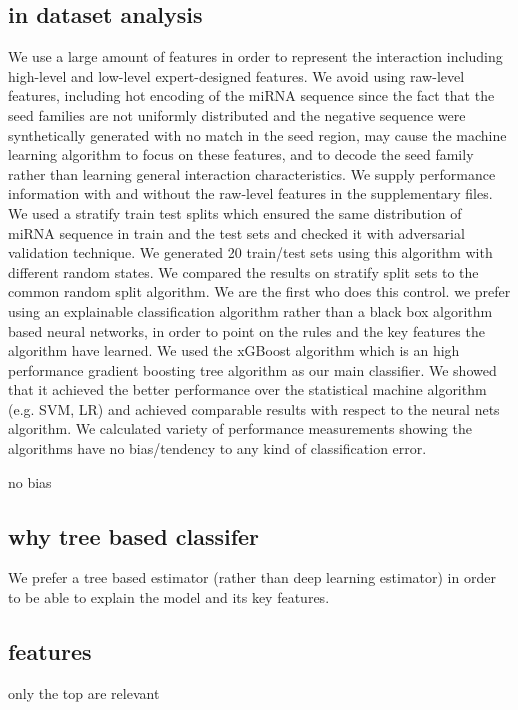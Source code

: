 \documentclass{bmcart}
\begin{document}
\subsection{in dataset analysis}
We use a large amount of features in order to represent the interaction including high-level and low-level expert-designed features. We avoid using raw-level features, including hot encoding of the miRNA sequence since the fact that the seed families are not uniformly distributed and the negative sequence were synthetically generated with no match in the seed region, may cause the machine learning algorithm to focus on these features, and to decode the seed family rather than learning general interaction characteristics. We supply performance information with and without the raw-level features in the supplementary files. 
We used a stratify train test splits which ensured the same distribution of miRNA sequence in train and the test sets and checked it with adversarial validation technique. We generated 20 train/test sets using this algorithm with different random states. We compared the results on stratify split sets to the common random split algorithm. We are the first who does this control.
we prefer using an explainable classification algorithm rather than a black box algorithm based neural networks, in order to point on the rules and the key features the algorithm have learned. We used the xGBoost algorithm which is an high performance gradient boosting tree algorithm as our main classifier. We showed that it achieved the better performance over the statistical machine algorithm (e.g. SVM, LR) and achieved comparable results with respect to the neural nets algorithm.
We calculated variety of performance measurements showing the algorithms have no bias/tendency to any kind of classification error. 

no bias


\subsection{why tree based classifer}
We prefer a tree based estimator (rather than deep learning estimator) in order to be able to explain the model and its key features.


\subsection{features}
only the top are relevant
\end{document}
